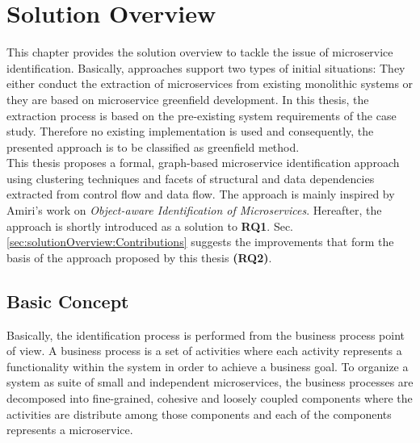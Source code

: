 \chapter{Solution Overview}
\label{ch:SolutionOverview}
This chapter provides the solution overview to tackle the issue of microservice identification. Basically, approaches support two types of initial situations: They either conduct the extraction of microservices from existing monolithic systems or they are based on microservice greenfield development. In this thesis, the extraction process is based on the pre-existing system requirements of the case study. Therefore no existing implementation is used and consequently, the presented approach is to be classified as greenfield method.\\
This thesis proposes a formal, graph-based microservice identification approach using clustering techniques and facets of structural and data dependencies extracted from control flow and data flow. The approach is mainly inspired by Amiri's  work on \textit{Object-aware Identification of Microservices}. Hereafter, the approach \cite{ObjectAwareAmiri} is shortly introduced as a solution to \textbf{RQ1}. Sec.\ref{sec:solutionOverview:Contributions} suggests the improvements that form the basis of the approach proposed by this thesis \textbf{(RQ2)}.


\section{Basic Concept}
\label{sec:solutionOverview:basicConcept}
Basically, the identification process is performed from the business process point of view. A business process is a set of activities where each activity represents a functionality within the system in order to achieve a business goal. To organize a system as suite of small and independent microservices, the business processes are decomposed into fine-grained, cohesive and loosely coupled components where the activities are distribute among those components and each of the components represents a microservice.\\



